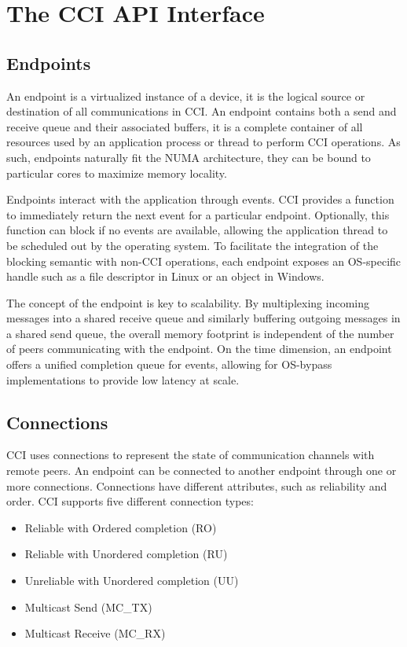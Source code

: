 \section{The CCI API Interface}
\label{sec:interface}

\subsection{Endpoints}
An endpoint is a virtualized instance of a device, it is the logical source 
or destination of all communications in CCI. An endpoint contains both a send 
and receive queue and their associated buffers, it is a complete container 
of all resources used by an application process or thread to perform CCI 
operations. As such, endpoints naturally fit the NUMA architecture, they can 
be bound to particular cores to maximize memory locality.

Endpoints interact with the application through events. CCI provides a 
function to immediately return the next event for a particular endpoint. 
Optionally, this function can block if no events are available, allowing the 
application thread to be scheduled out by the operating system. To facilitate 
the integration of the blocking semantic with non-CCI operations, each endpoint 
exposes an OS-specific handle such as a file descriptor in Linux or an object in 
Windows.

The concept of the endpoint is key to scalability. By multiplexing incoming 
messages into a shared receive queue and similarly buffering outgoing 
messages in a shared send queue, the overall memory footprint is independent 
of the number of peers communicating with the endpoint. On the time dimension, 
an endpoint offers a unified completion queue for events, allowing for 
OS-bypass implementations to provide low latency at scale.

\subsection{Connections}
CCI uses connections to represent the state of communication channels with 
remote peers. An endpoint can be connected to another endpoint through one or 
more connections. Connections have different attributes, such as 
reliability and order. CCI supports five different connection types:

\begin{itemize}
\item Reliable with Ordered completion (RO)
\item Reliable with Unordered completion (RU)
\item Unreliable with Unordered completion (UU)
\item Multicast Send (MC\_TX)
\item Multicast Receive (MC\_RX)
\end{itemize}

